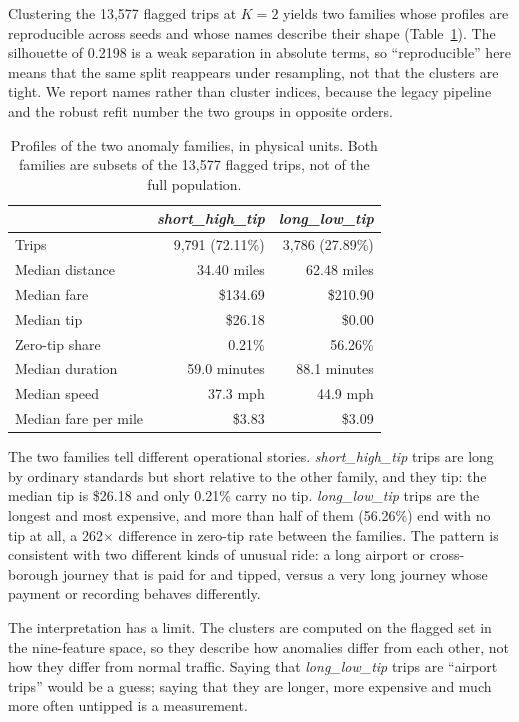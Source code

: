 \documentclass[11pt,a4paper]{article}
\begin{document}
Clustering the 13{,}577 flagged trips at $K=2$ yields two families whose profiles are reproducible across seeds and whose names describe their shape (Table~\ref{tab:clusters}). The silhouette of 0.2198 is a weak separation in absolute terms, so ``reproducible'' here means that the same split reappears under resampling, not that the clusters are tight. We report names rather than cluster indices, because the legacy pipeline and the robust refit number the two groups in opposite orders.

\begin{table}[t]
\centering
\small
\caption{Profiles of the two anomaly families, in physical units. Both families are subsets of the 13{,}577 flagged trips, not of the full population.}
\label{tab:clusters}
\begin{tabular}{lrr}
\toprule
 & \emph{short\_high\_tip} & \emph{long\_low\_tip} \\
\midrule
Trips & 9{,}791 (72.11\%) & 3{,}786 (27.89\%) \\
Median distance & 34.40 miles & 62.48 miles \\
Median fare & \$134.69 & \$210.90 \\
Median tip & \$26.18 & \$0.00 \\
Zero-tip share & 0.21\% & 56.26\% \\
Median duration & 59.0 minutes & 88.1 minutes \\
Median speed & 37.3 mph & 44.9 mph \\
Median fare per mile & \$3.83 & \$3.09 \\
\bottomrule
\end{tabular}
\end{table}

The two families tell different operational stories. \emph{short\_high\_tip} trips are long by ordinary standards but short relative to the other family, and they tip: the median tip is \$26.18 and only 0.21\% carry no tip. \emph{long\_low\_tip} trips are the longest and most expensive, and more than half of them (56.26\%) end with no tip at all, a 262$\times$ difference in zero-tip rate between the families. The pattern is consistent with two different kinds of unusual ride: a long airport or cross-borough journey that is paid for and tipped, versus a very long journey whose payment or recording behaves differently.

The interpretation has a limit. The clusters are computed on the flagged set in the nine-feature space, so they describe how anomalies differ from each other, not how they differ from normal traffic. Saying that \emph{long\_low\_tip} trips are ``airport trips'' would be a guess; saying that they are longer, more expensive and much more often untipped is a measurement.
\end{document}
